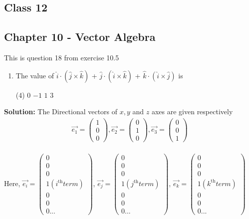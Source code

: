 \documentclass[12pt]{article}
\newcommand{\myvec}[1]{\ensuremath{\begin{pmatrix}#1\end{pmatrix}}}
\begin{document}
\begin{center}
 \section*{\textbf{Class 12}}
 \subsection*{Chapter 10 - Vector Algebra}
\end{center}
This is question 18 from exercise 10.5 \\
\begin{enumerate}
\item  The value of  $\hat{i} \cdot (\hat{j} \times \hat{k})$  + $\hat{j} \cdot (\hat{i} \times \hat{k})$ + $\hat{k} \cdot (\hat{i} \times \hat{j} )$ is
 \begin{tasks}(4)
    \task $0$ 
    \task $-1$ 
    \task $1$ 
    \task $3$  
    \end{tasks}
\end{enumerate}
\textbf{Solution:}
The Directional vectors of $x,y$ and $z$ axes are given respectively 
\begin{align}
  \vec{e_1} =\myvec{1\\0\\0},\vec{e_2}=\myvec{0\\1\\0},\vec{e_3} =\myvec{0\\0\\1}
\end{align}\\
Here,
$\vec{e_i} = \myvec{0\\0\\0\\1 (i^{\text{th}} term)\\0\\0\\0...}$, $\vec{e_j} = \myvec{0\\0\\0\\1 (j^{\text{th}} term)\\0\\0\\0...}$, $\vec{e_k} = \myvec{0\\0\\0\\1 (k^{\text{th}} term)\\0\\0\\0...}$ \\
\end{document}
